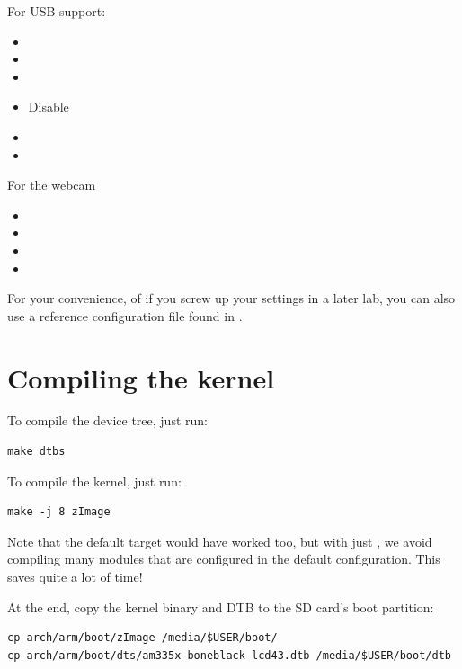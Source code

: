 For USB support:
\begin{itemize}
\item {}
\item {}
\item {}
\item Disable 
\item {}
\item {}
\end{itemize}

For the webcam
\begin{itemize}
\item {} 
\item {}
\item {}
\item {}
\end{itemize}

For your convenience, of if you screw up your settings in a later lab,
you can also use a reference configuration file found in
.

\section{Compiling the kernel}

To compile the device tree, just run:
\begin{verbatim}
make dtbs
\end{verbatim}

To compile the kernel, just run:
\begin{verbatim}
make -j 8 zImage
\end{verbatim}

Note that the default  target would have worked too, but with
just , we avoid compiling many modules that are configured
in the default configuration. This saves quite a lot of time!

At the end, copy the kernel binary and DTB to the SD card's boot
partition:

\begin{verbatim}
cp arch/arm/boot/zImage /media/$USER/boot/
cp arch/arm/boot/dts/am335x-boneblack-lcd43.dtb /media/$USER/boot/dtb
\end{verbatim}

